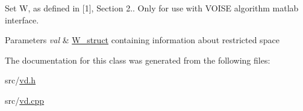 Set W, as defined in \mbox{[}1\mbox{]}, Section 2.. Only for use with V\+O\+I\+SE algorithm matlab interface. 
\begin{DoxyParams}{Parameters}
{\em val} & \mbox{\hyperlink{structW__struct}{W\+\_\+struct}} containing information about restricted space \\
\hline
\end{DoxyParams}


The documentation for this class was generated from the following files\+:\begin{DoxyCompactItemize}
\item 
src/\mbox{\hyperlink{vd_8h}{vd.\+h}}\item 
src/\mbox{\hyperlink{vd_8cpp}{vd.\+cpp}}\end{DoxyCompactItemize}
